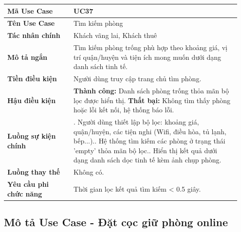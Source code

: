 \documentclass[a4paper,oneside]{report}
\begin{document}
\begin{longtable}[]{@{}>{\RaggedRight\arraybackslash}p{0.27\linewidth}>{\RaggedRight\arraybackslash}p{0.68\linewidth}@{}}
\toprule
\textbf{Mã Use Case} & UC37\tabularnewline
\midrule
\endhead
\textbf{Tên Use Case} & Tìm kiếm phòng\tabularnewline
\textbf{Tác nhân chính} & Khách vãng lai, Khách thuê\tabularnewline
\textbf{Mô tả ngắn} & Tìm kiếm phòng trống phù hợp theo khoảng giá, vị
trí quận/huyện và tiện ích mong muốn dưới dạng danh sách tinh
tế.\tabularnewline
\textbf{Tiền điều kiện} & Người dùng truy cập trang chủ tìm
phòng.\tabularnewline
\textbf{Hậu điều kiện} & \textbf{Thành công:} Danh sách phòng trống thỏa mãn bộ lọc được hiển thị.\newline 
\textbf{Thất bại:} Không tìm thấy phòng hoặc lỗi kết nối, hệ thống báo lỗi.\tabularnewline
\textbf{Luồng sự kiện chính} & 1. Người dùng thiết
lập bộ lọc: khoảng giá, quận/huyện, các tiện nghi (Wifi, điều hòa, tủ
lạnh, bếp...).\newline 2. Hệ thống tìm kiếm các phòng ở trạng thái
'empty' thỏa mãn bộ lọc.\newline 3. Hiển thị kết quả dưới dạng danh
sách dọc tinh tế kèm ảnh chụp phòng.\tabularnewline
\textbf{Luồng thay thế} & Không có.\tabularnewline
\textbf{Yêu cầu phi chức năng} & Thời gian lọc kết quả tìm kiếm
\textless{} 0.5 giây.\tabularnewline
\bottomrule
\end{longtable}

\subsection{Mô tả Use Case - Đặt cọc giữ phòng online}
\end{document}
